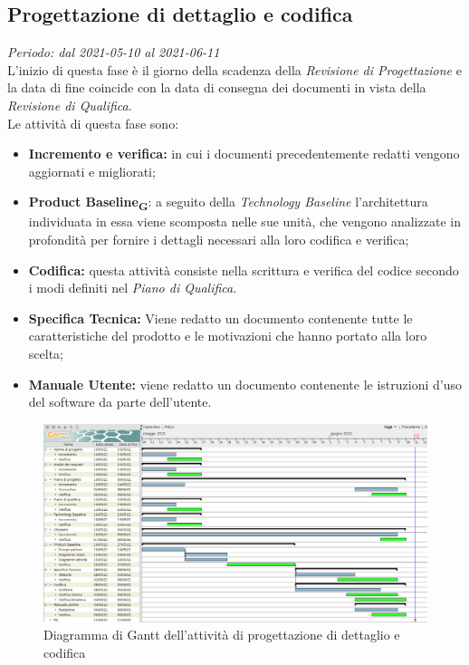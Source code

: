     \subsection{Progettazione di dettaglio e codifica}
        \textit{Periodo: dal 2021-05-10 al 2021-06-11}\\
        L’inizio di questa fase è il giorno della scadenza della \textit{Revisione di Progettazione} e la data di fine coincide con la data di consegna dei documenti in vista della \textit{Revisione di Qualifica}.\\
        Le attività di questa fase sono:
        \begin {itemize}
            \item \textbf{Incremento e verifica:} in cui i documenti precedentemente redatti vengono aggiornati e migliorati;
            \item \textbf{Product Baseline\textsubscript{\textbf{G}}}: a seguito della \textit{Technology Baseline} l’architettura individuata in essa viene scomposta nelle sue unità, che vengono analizzate in profondità per fornire i dettagli necessari alla loro codifica e verifica;
            \item \textbf{Codifica:} questa attività consiste nella scrittura e verifica del codice secondo i modi definiti nel \textit{Piano di Qualifica}.
            \item \textbf{Specifica Tecnica:} Viene redatto un documento contenente tutte le caratteristiche del prodotto e le motivazioni che hanno portato alla loro scelta;
            \item \textbf{Manuale Utente:} viene redatto un documento contenente le istruzioni d'uso del software da parte dell'utente.
        \end {itemize}
        \begin{figure}[!ht]
            \caption{Diagramma di Gantt dell’attività di progettazione di dettaglio e codifica}
            \vspace{5px}
            \includegraphics[scale=0.22]{../../../Images/Diagrammi/Gantt/progettazioneCodifica.png}
            \centering
        \end{figure}
        
